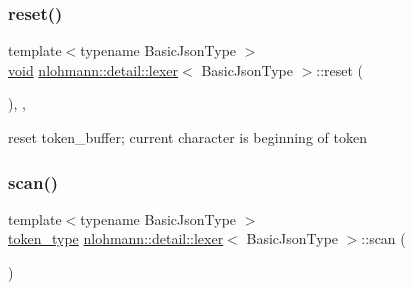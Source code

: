\subsubsection{\texorpdfstring{reset()}{reset()}}
{\footnotesize\ttfamily template$<$typename Basic\+Json\+Type $>$ \\
\mbox{\hyperlink{namespacenlohmann_1_1detail_a59fca69799f6b9e366710cb9043aa77d}{void}} \mbox{\hyperlink{classnlohmann_1_1detail_1_1lexer}{nlohmann\+::detail\+::lexer}}$<$ Basic\+Json\+Type $>$\+::reset (\begin{DoxyParamCaption}{ }\end{DoxyParamCaption})\hspace{0.3cm}{\ttfamily [inline]}, {\ttfamily [private]}, {\ttfamily [noexcept]}}



reset token\+\_\+buffer; current character is beginning of token 

\mbox{\label{classnlohmann_1_1detail_1_1lexer_aac3041cd2b9291e64fee38db422863c9}} 
\subsubsection{\texorpdfstring{scan()}{scan()}}
{\footnotesize\ttfamily template$<$typename Basic\+Json\+Type $>$ \\
\mbox{\hyperlink{classnlohmann_1_1detail_1_1lexer_a3f313cdbe187cababfc5e06f0b69b098}{token\+\_\+type}} \mbox{\hyperlink{classnlohmann_1_1detail_1_1lexer}{nlohmann\+::detail\+::lexer}}$<$ Basic\+Json\+Type $>$\+::scan (\begin{DoxyParamCaption}{ }\end{DoxyParamCaption})\hspace{0.3cm}{\ttfamily [inline]}}

\mbox{\label{classnlohmann_1_1detail_1_1lexer_a6f717deb553337736f27cdacccaee536}} 
